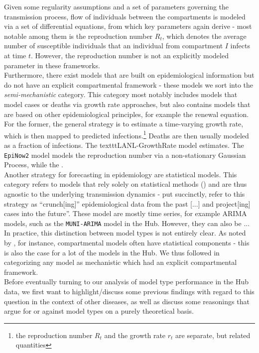 Given some regularity assumptions and a set of parameters governing the transmission process, flow of individuals between the compartments is modeled via a set of differential equations, from which key parameters again derive - most notable among them is the reproduction number $R_t$, which denotes the average number of susceptible individuals that an individual from compartment $I$ infects at time $t$. However, the reproduction number is not an explicitly modeled parameter in these frameworks.\\
Furthermore, there exist models that are built on epidemiological information but do not have an explicit compartmental framework - these models we sort into the \textit{semi-mechanistic} category. This category most notably includes models that model cases or deaths via growth rate approaches, but also contains models that are based on other epidemiological principles, for example the renewal equation. For the former, the general strategy is to estimate a time-varying growth rate, which is then mapped to predicted infections.\footnote{the reproduction number $R_t$ and the growth rate $r_t$ are separate, but related quantities} Deaths are then usually modeled as a fraction of infections. The texttt{LANL-GrowthRate} model estimates. The \texttt{EpiNow2} model models the reproduction number via a non-stationary Gaussian Process,  while the . \\
Another strategy for forecasting in epidemiology are statistical models. %
This category refers to models that rely solely on statistical methods () and are thus agnostic to the underlying transmission dynamics - put succinctly, \cite{holmdahl_wrong_2020} refer to this strategy as ``crunch[ing]'' epidemiological data from the past [...] and project[ing] cases into the future''. These model are mostly time series, for example ARIMA models, such as the \texttt{MUNI-ARIMA} model in the Hub. However, they can also be ...\\
In practice, this distinction between model types is not entirely clear. As noted by \cite{reich_collaborative_2019}, for instance, compartmental models often have statistical components - this is also the case for a lot  of the models in the Hub. We thus followed \cite{reich_collaborative_2019} in categorizing any model as mechanistic which had an explicit compartmental framework.\\
Before eventually turning to our analysis of model type performance in the Hub data, we first want to highlight/discuss some previous findings with regard to this question in the context of other diseases, as well as discuss some reasonings that argue for or against model types on a purely theoretical basis.\\
